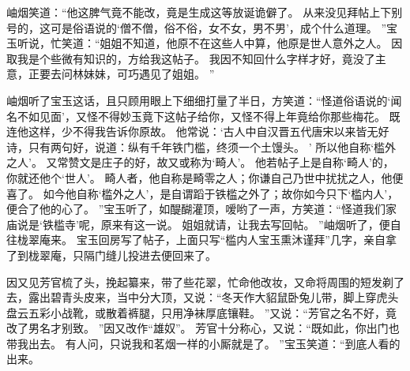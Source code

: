 岫烟笑道：“他这脾气竟不能改，竟是生成这等放诞诡僻了。
从来没见拜帖上下别号的，这可是俗语说的‘僧不僧，俗不俗，女不女，男不男’，成个什么道理。
”宝玉听说，忙笑道：“姐姐不知道，他原不在这些人中算，他原是世人意外之人。
因取我是个些微有知识的，方给我这帖子。
我因不知回什么字样才好，竟没了主意，正要去问林妹妹，可巧遇见了姐姐。
”\par
岫烟听了宝玉这话，且只顾用眼上下细细打量了半日，方笑道：“怪道俗语说的‘闻名不如见面’，又怪不得妙玉竟下这帖子给你，又怪不得上年竟给你那些梅花。
既连他这样，少不得我告诉你原故。
他常说：‘古人中自汉晋五代唐宋以来皆无好诗，只有两句好，说道：纵有千年铁门槛，终须一个土馒头。
’
所以他自称‘槛外之人’。
又常赞文是庄子的好，故又或称为‘畸人’。
他若帖子上是自称‘畸人’的，你就还他个‘世人’。
畸人者，他自称是畸零之人；你谦自己乃世中扰扰之人，他便喜了。
如今他自称‘槛外之人’，是自谓蹈于铁槛之外了；故你如今只下‘槛内人’，便合了他的心了。
”宝玉听了，如醍醐灌顶，嗳哟了一声，方笑道：“怪道我们家庙说是‘铁槛寺’呢，原来有这一说。
姐姐就请，让我去写回帖。
”岫烟听了，便自往栊翠庵来。
宝玉回房写了帖子，上面只写“槛内人宝玉熏沐谨拜”几字，亲自拿了到栊翠庵，只隔门缝儿投进去便回来了。
\par
因又见芳官梳了头，挽起纂来，带了些花翠，忙命他改妆，又命将周围的短发剃了去，露出碧青头皮来，当中分大顶，又说：“冬天作大貂鼠卧兔儿带，脚上穿虎头盘云五彩小战靴，或散着裤腿，只用净袜厚底镶鞋。
”又说：“芳官之名不好，竟改了男名才别致。
”因又改作“雄奴”。
芳官十分称心，又说：“既如此，你出门也带我出去。
有人问，只说我和茗烟一样的小厮就是了。
”宝玉笑道：“到底人看的出来。
